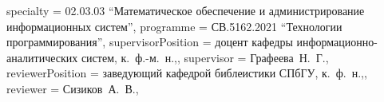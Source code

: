 {    specialty          = {02.03.03 \enquote{Математическое обеспечение и администрирование информационных систем}},
    programme          = {СВ.5162.2021 \enquote{Технологии программирования}},
    supervisorPosition = {доцент кафедры информационно-аналитических систем, к.~ф.-м.~н.,},
    supervisor         = {Графеева~Н.~Г.},
    reviewerPosition   = {заведующий кафедрой библеистики СПбГУ, к.~ф.~н.,},
    reviewer           = {Сизиков~А.~В.},
}

